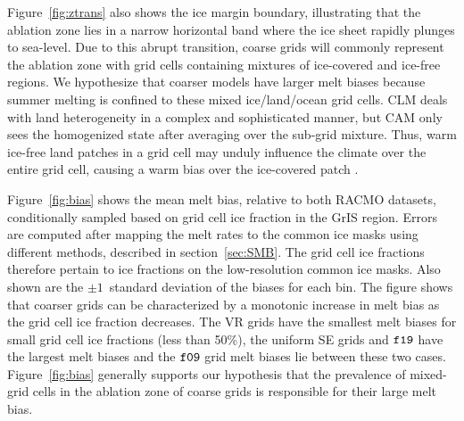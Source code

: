 \documentclass[draft]{agujournal2019}
\begin{document}
Figure~\ref{fig:ztrans} also shows the ice margin boundary, illustrating that the ablation zone lies in a narrow horizontal band where the ice sheet rapidly plunges to sea-level. Due to this abrupt transition, coarse grids will commonly represent the ablation zone with grid cells containing mixtures of ice-covered and ice-free regions. We hypothesize that coarser models have larger melt biases because summer melting is confined to these mixed ice/land/ocean grid cells. CLM deals with land heterogeneity in a complex and sophisticated manner, but CAM only sees the homogenized state after {\color{blue}{area}} averaging over the sub-grid mixture. Thus, warm ice-free land patches in a grid cell may unduly influence the climate over the entire grid cell, causing a warm bias over the ice-covered patch {\color{blue}{and more melting}}.

Figure~\ref{fig:bias} shows the mean melt bias, relative to both RACMO datasets, conditionally sampled based on grid cell ice fraction in the GrIS region. Errors are computed after mapping the melt rates to the common ice masks using different methods, described in section~\ref{sec:SMB}. The grid cell ice fractions therefore pertain to ice fractions on the low-resolution common ice masks. Also shown are the $\pm 1$~standard deviation of the biases for each bin. The figure shows that coarser grids can be characterized by a monotonic increase in melt bias as the grid cell ice fraction decreases. The VR grids have the smallest melt biases for small grid cell ice fractions (less than 50\%), the {\color{blue}{quasi-}}uniform SE grids and $\tt f19$ have the largest melt biases and the $\tt f09$ grid melt biases lie between these two cases. Figure~\ref{fig:bias} generally supports our hypothesis that the prevalence of mixed-grid cells in the ablation zone of coarse grids is responsible for their large melt bias.
\end{document}
